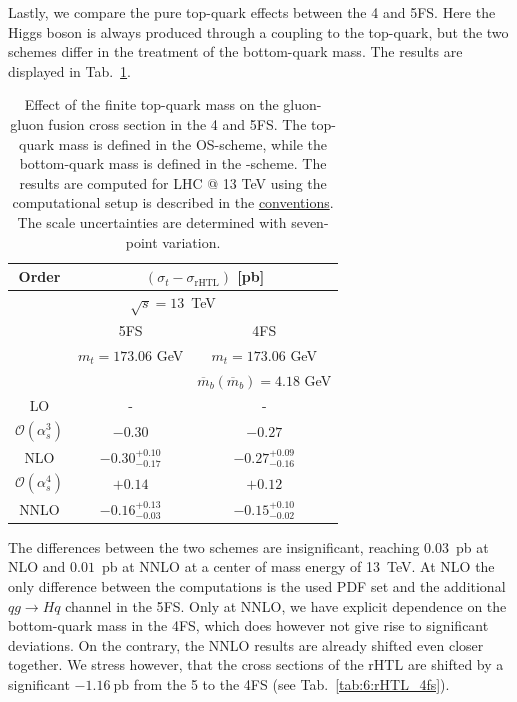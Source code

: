 Lastly, we compare the pure top-quark effects between the 4 and 5\acs{FS}. Here the Higgs boson is always produced through a coupling to the top-quark, but the two schemes differ in the treatment of the bottom-quark mass. The results are displayed in Tab.~\ref{tab:6:t-rHTL_4vs5FS}.
\begin{table}[t]
\centering
\begin{tabular}{ccc}
  \hline
  Order & \multicolumn{2}{c}{$(\sigma_{t} - \sigma_\text{rHTL})$ [pb]} \\
  \hline
  \hline
  \multicolumn{3}{c}{$\sqrt{s}=13$~TeV} \\
  \hline
  & 5FS & 4FS \\
  & $m_t = 173.06$ GeV &  $m_t = 173.06$ GeV \\
  & & $\overline{m}_b(\overline{m}_b)=4.18$ GeV\\
  \hline
  LO & - & - \\
  \hline
  $\mathcal{O}(\alpha_s^3)$ & $-0.30$  &  $-0.27$ \\
  NLO & $-0.30^{+0.10}_{-0.17}$ & $-0.27^{+0.09}_{-0.16}$ \\
  \hline
  $\mathcal{O}(\alpha_s^4)$ & $+0.14$ & $+0.12$ \\
  NNLO & $-0.16^{+0.13}_{-0.03}$ & $-0.15^{+0.10}_{-0.02}$\\
  \hline
  \end{tabular}
\caption{Effect of the finite top-quark mass on the gluon-gluon fusion cross section in the 4 and 5\acs{FS}. The top-quark mass is defined in the \acs{OS}-scheme, while the bottom-quark mass is defined in the \MS-scheme. The results are computed for LHC @ 13 TeV using the computational setup is described in the \hyperref[chap:notation_and_conventions]{conventions}. The scale uncertainties are determined with seven-point variation.}
\label{tab:6:t-rHTL_4vs5FS}
\end{table}
The differences between the two schemes are insignificant, reaching $0.03$~pb at \acs{NLO} and $0.01$~pb at \acs{NNLO} at a center of mass energy of 13~TeV. At \acs{NLO} the only difference between the computations is the used \acs{PDF} set and the additional $qg \longrightarrow Hq$ channel in the 5\acs{FS}. Only at \acs{NNLO}, we have explicit dependence on the bottom-quark mass in the 4\acs{FS}, which does however not give rise to significant deviations. On the contrary, the \acs{NNLO} results are already shifted even closer together. We stress however, that the cross sections of the \acs{rHTL} are shifted by a significant $-1.16\ \mathrm{pb}$ from the 5 to the 4\acs{FS} (see Tab.~\ref{tab:6:rHTL_4fs}).

